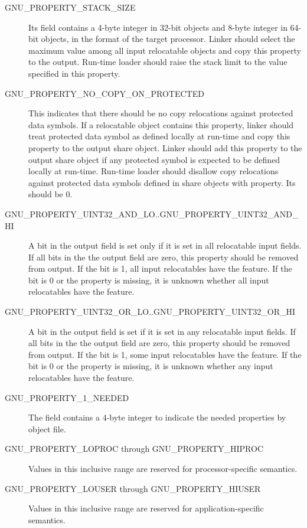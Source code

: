 \begin{description}
 \item[GNU_PROPERTY_STACK_SIZE]
   Its  field contains a 4-byte integer in 32-bit objects
   and 8-byte integer in 64-bit objects, in the format of the target
   processor.  Linker should select the maximum value among all
   input relocatable objects and copy this property to the output.
   Run-time loader should raise the stack limit to the value specified
   in this property.
 \item[GNU_PROPERTY_NO_COPY_ON_PROTECTED]
   \begin{sloppypar}
   This indicates that there should be no copy relocations against
   protected data symbols.  If a relocatable object contains this
   property, linker should treat protected data symbol as defined
   locally at run-time and copy this property to the output share
   object.  Linker should add this property to the output share
   object if any protected symbol is expected to be defined locally
   at run-time.  Run-time loader should disallow copy relocations
   against protected data symbols defined in share objects with
    property.  Its
    should be 0.
   \end{sloppypar}
 \item[GNU_PROPERTY_UINT32_AND_LO..GNU_PROPERTY_UINT32_AND_HI]
   A bit in the output  field is set only if it is set in
   all relocatable input  fields.  If all bits in the
   the output  field are zero, this property should be
   removed from output.  If the bit is 1, all input relocatables have
   the feature.  If the bit is 0 or the property is missing, it is
   unknown whether all input relocatables have the feature.
 \item[GNU_PROPERTY_UINT32_OR_LO..GNU_PROPERTY_UINT32_OR_HI]
   A bit in the output  field is set if it is set in any
   relocatable input  fields.  If all bits in the
   the output  field are zero, this property should be
   removed from output.  If the bit is 1, some input relocatables have
   the feature.  If the bit is 0 or the property is missing, it is
   unknown whether any input relocatables have the feature.
 \item[GNU_PROPERTY_1_NEEDED]
   The  field contains a 4-byte integer to indicate the
   needed properties by object file.
 \item[GNU_PROPERTY_LOPROC through GNU_PROPERTY_HIPROC]
   Values in this inclusive range are reserved for processor-specific
   semantics.
 \item[GNU_PROPERTY_LOUSER through GNU_PROPERTY_HIUSER]
   Values in this inclusive range are reserved for application-specific
   semantics.
\end{description}

